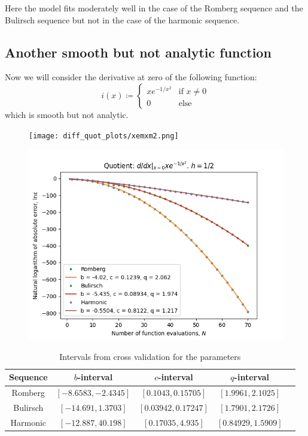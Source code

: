 Here the model fits moderately well in the case of the Romberg sequence and the Bulirsch sequence but not in the case of the harmonic sequence. 

\subsection{Another smooth but not analytic function}

Now we will consider the derivative at zero of the following function:
\[
i(x)\coloneqq \begin{cases}
xe^{-1/x^2} & \text{if } x \neq 0\\
0 & \text{else}
\end{cases}
\]
which is smooth but not analytic.
\begin{figure}[H]
\centering
\begin{minipage}{0.45\textwidth}
\centering
\texttt{[image: diff\_quot\_plots/xemxm2.png]}
\end{minipage}
\begin{minipage}{0.45\textwidth}
\centering
\includegraphics[scale=0.45]{diff_quot_plots/xemxm2_hp_trend.png}
\end{minipage}
\end{figure}

\begin{table}[H]
    \centering
    \begin{tabular}{c|c||c|c|c}
Sequence & \(b\)-interval & \(c\)-interval & \(q\)-interval\\\hline\hline
Romberg &\([-8.6583, -2.4345]\) & \([0.1043, 0.15705]\) & \([1.9961, 2.1025]\)\\
Bulirsch & \([-14.691, 1.3703]\) & \([0.03942, 0.17247]\) & \([1.7901, 2.1726]\)\\
Harmonic & \([-12.887, 40.198]\) & \([0.17035, 4.935]\) & \([0.84929, 1.5909]\)\\
    \end{tabular}
    \caption{Intervals from cross validation for the parameters}
    \label{tab:my_label}
\end{table}

